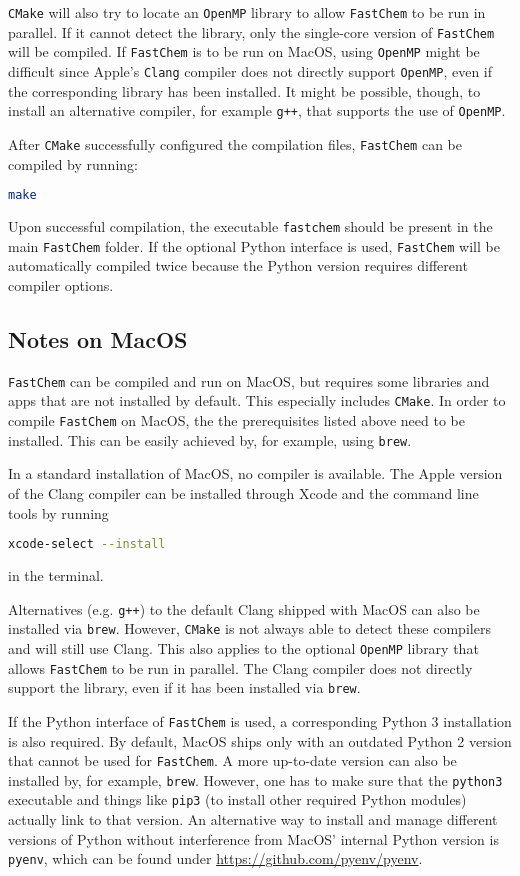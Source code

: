 \documentclass[numbers=noenddot]{aux/fcmanual}
\newcommand{\fc}{\texttt{FastChem}\xspace}
\newcommand{\ttt}[1]{\texttt {#1}}
\begin{document}
\texttt{CMake} will also try to locate an \texttt{OpenMP} library to allow \fc to be run in parallel. If it cannot detect the library, only the single-core version of \fc will be compiled. If \fc is to be run on MacOS, using \texttt{OpenMP} might be difficult since Apple's \texttt{Clang} compiler does not directly support \texttt{OpenMP}, even if the corresponding library has been installed. It might be possible, though, to install an alternative compiler, for example \texttt{g++}, that supports the use of \texttt{OpenMP}. 

After \texttt{CMake} successfully configured the compilation files, \fc can be compiled by running:
\begin{lstlisting}[language=bash]
  make
\end{lstlisting}
Upon successful compilation, the executable \texttt{fastchem} should be present in the main \fc folder. If the optional Python interface is used, \fc will be automatically compiled twice because the Python version requires different compiler options.


\subsection{Notes on MacOS}

\fc can be compiled and run on MacOS, but requires some libraries and apps that are not installed by default. This especially includes \texttt{CMake}. In order to compile \fc on MacOS, the the prerequisites listed above need to be installed. This can be easily achieved by, for example, using \texttt{brew}. 

In a standard installation of MacOS, no compiler is available. The Apple version of the Clang compiler can be installed through Xcode and the command line tools by running
\begin{lstlisting}[language=bash]
  xcode-select --install
\end{lstlisting}
in the terminal.

Alternatives (e.g. \texttt{g++}) to the default Clang shipped with MacOS can also be installed via \texttt{brew}. However, \texttt{CMake} is not always able to detect these compilers and will still use Clang. This also applies to the optional \ttt{OpenMP} library that allows \fc to be run in parallel. The Clang compiler does not directly support the library, even if it has been installed via \texttt{brew}.

If the Python interface of \fc is used, a corresponding Python 3 installation is also required. By default, MacOS ships only with an outdated Python 2 version that cannot be used for \fc. A more up-to-date version can also be installed by, for example, \texttt{brew}. However, one has to make sure that the \texttt{python3} executable and things like \texttt{pip3} (to install other required Python modules) actually link to that version. An alternative way to install and manage different versions of Python without interference from MacOS' internal Python version is \texttt{pyenv}, which can be found under \url{https://github.com/pyenv/pyenv}. 
\end{document}
